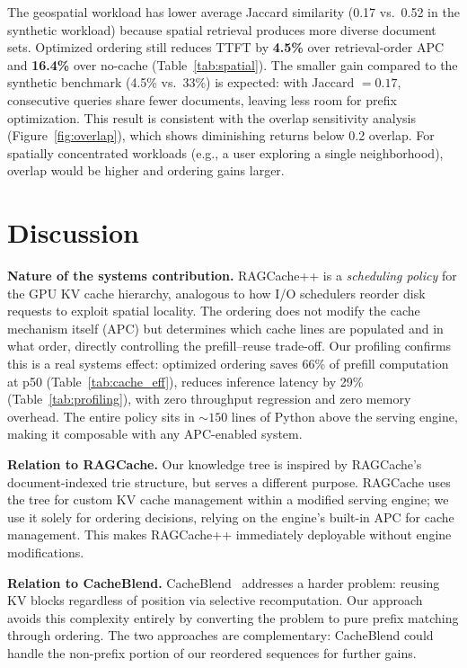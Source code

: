 \documentclass{article}
\begin{document}
The geospatial workload has lower average Jaccard similarity (0.17 vs.\ 0.52 in the synthetic workload) because spatial retrieval produces more diverse document sets. Optimized ordering still reduces TTFT by \textbf{4.5\%} over retrieval-order APC and \textbf{16.4\%} over no-cache (Table~\ref{tab:spatial}). The smaller gain compared to the synthetic benchmark (4.5\% vs.\ 33\%) is expected: with Jaccard $= 0.17$, consecutive queries share fewer documents, leaving less room for prefix optimization. This result is consistent with the overlap sensitivity analysis (Figure~\ref{fig:overlap}), which shows diminishing returns below 0.2 overlap. For spatially concentrated workloads (e.g., a user exploring a single neighborhood), overlap would be higher and ordering gains larger.

\section{Discussion}
\label{sec:discussion}

\textbf{Nature of the systems contribution.}
RAGCache++ is a \emph{scheduling policy} for the GPU KV cache hierarchy, analogous to how I/O schedulers reorder disk requests to exploit spatial locality. The ordering does not modify the cache mechanism itself (APC) but determines which cache lines are populated and in what order, directly controlling the prefill--reuse trade-off. Our profiling confirms this is a real systems effect: optimized ordering saves 66\% of prefill computation at p50 (Table~\ref{tab:cache_eff}), reduces inference latency by 29\% (Table~\ref{tab:profiling}), with zero throughput regression and zero memory overhead. The entire policy sits in ${\sim}150$ lines of Python above the serving engine, making it composable with any APC-enabled system.

\textbf{Relation to RAGCache.} Our knowledge tree is inspired by RAGCache's~\citep{jin2025ragcache} document-indexed trie structure, but serves a different purpose. RAGCache uses the tree for custom KV cache management within a modified serving engine; we use it solely for ordering decisions, relying on the engine's built-in APC for cache management. This makes RAGCache++ immediately deployable without engine modifications.

\textbf{Relation to CacheBlend.} CacheBlend~\citep{yao2025cacheblend} addresses a harder problem: reusing KV blocks regardless of position via selective recomputation. Our approach avoids this complexity entirely by converting the problem to pure prefix matching through ordering. The two approaches are complementary: CacheBlend could handle the non-prefix portion of our reordered sequences for further gains.
\end{document}
